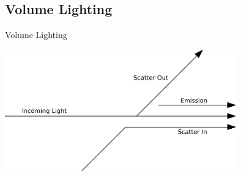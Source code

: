 \documentclass[10pt,handout,compress,professionalfont]{beamer}
\begin{document}
\subsection{Volume Lighting}
\begin{frame}{Volume Lighting}

    \centering
    \vspace{0cm}
    \includegraphics[width=100mm]{../img/diag/vol_scatter.pdf}

\end{frame}
\end{document}
